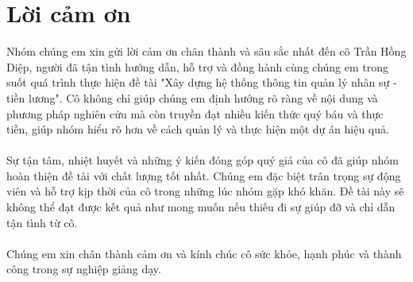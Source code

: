 \chapter*{Lời cảm ơn}
\label{thanks}
Nhóm chúng em xin gửi lời cảm ơn chân thành và sâu sắc nhất đến cô Trần Hồng Diệp, người đã tận tình hướng dẫn, hỗ trợ và đồng hành cùng chúng em trong suốt quá trình thực hiện đề tài "Xây dựng hệ thống thông tin quản lý nhân sự - tiền lương". Cô không chỉ giúp chúng em định hướng rõ ràng về nội dung và phương pháp nghiên cứu mà còn truyền đạt nhiều kiến thức quý báu và thực tiễn, giúp nhóm hiểu rõ hơn về cách quản lý và thực hiện một dự án hiệu quả.\\\\
Sự tận tâm, nhiệt huyết và những ý kiến đóng góp quý giá của cô đã giúp nhóm hoàn thiện đề tài với chất lượng tốt nhất. Chúng em đặc biệt trân trọng sự động viên và hỗ trợ kịp thời của cô trong những lúc nhóm gặp khó khăn. Đề tài này sẽ không thể đạt được kết quả như mong muốn nếu thiếu đi sự giúp đỡ và chỉ dẫn tận tình từ cô.\\\\
Chúng em xin chân thành cảm ơn và kính chúc cô sức khỏe, hạnh phúc và thành công trong sự nghiệp giảng dạy.
